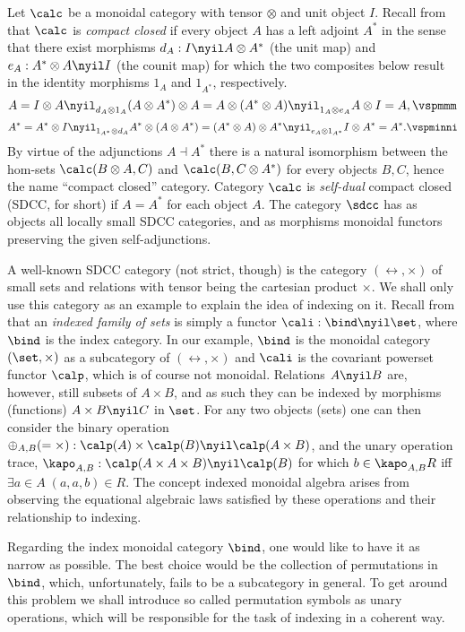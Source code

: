 \documentclass{eptcs}
\begin{document}
Let $\calc $ be a monoidal category with tensor $\otimes $ and unit object $I$.
Recall from \cite{cc,tra} that $\calc $ is {\em compact closed\/} if every
object $A$ has a left adjoint $A^*$ in the sense that there exist morphisms
$d_A:I\nyil A\otimes A^*$ (the unit map) and $e_A:A^*\otimes A\nyil I$ (the
counit map) for which the two composites below result in the identity
morphisms $1_A$ and $1_{A^*}$, respectively.
\[ A=I\otimes A\nyil _{d _A\otimes  1_A}(A\otimes A^*)
\otimes A=A\otimes (A^*\otimes A)\nyil _{1_A\otimes e_A}
A\otimes I=A, \vspmmm\] 
\[ A^*=A^*\otimes I\nyil _{1_{A^*} \otimes d_A}A^*\otimes 
(A\otimes A^*)=(A^*\otimes A)\otimes A^*\nyil _{e_A\otimes 1_{A^*}}
I\otimes A^*=A^*. \vspminni \]
By virtue of the adjunctions $A\dashv A^*$ there is a natural isomorphism between the 
hom-sets $\calc (B\otimes A,C)$ and $\calc (B,C\otimes A^*)$ for every objects $B,C$,
hence the name ``compact closed'' category. Category $\calc $ is {\em
self-dual\/} compact closed (SDCC, for short) if $A=A^*$ for each object $A$.
The category $\sdcc $ has as objects all locally small \cite{mcl}
SDCC categories, and as
morphisms monoidal functors preserving the given self-adjunctions.

A well-known SDCC category (not strict, though) is the category $(\rel ,\times)$ of 
small sets and
relations with tensor being the cartesian product $\times $.
We shall only use this category as an example to explain the idea of indexing on it.
Recall from \cite {bur,hel} that an {\em indexed family of sets\/} is simply a functor
$\cali : \bind\nyil \set $, where $\bind $ is the index category.  In our example,
$\bind $ is the monoidal category $(\set ,\times)$ as a subcategory of $(\rel ,\times )$
and $\cali $ is the covariant powerset functor $\calp $, which is of course not
monoidal. Relations $A\nyil B$ are, however, still subsets of $A\times B$, and as 
such they can be indexed by morphisms (functions) $A\times B\nyil C$ in $\set $.
For any two objects (sets) one can then consider the binary operation $\oplus _{A,B}
(=\times ): \calp (A)\times \calp (B)\nyil \calp (A\times B)$, and the unary operation
trace, $\kapo _{A,B}:\calp (A\times A\times B)\nyil \calp (B)$ for which $b\in \kapo _{A,B}R$
iff $\exists a\in A\; (a,a,b)\in R$. The concept indexed monoidal algebra arises from
observing the equational algebraic laws satisfied by these operations and their 
relationship to indexing. 

  Regarding the index monoidal category $\bind $, one would like to have it as narrow as possible.
The best choice would be the collection of permutations in $\bind $, which, unfortunately,
fails to be a subcategory in general. To get around this 
problem we shall introduce so called permutation symbols as unary operations,
which will be responsible for the task of indexing in a coherent way.
\end{document}
